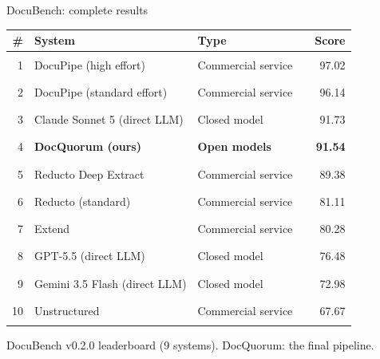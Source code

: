 \documentclass[aspectratio=169,10pt]{beamer}
\newcommand{\src}[1]{\par\vfill{\tiny\color{muted}#1\par}}
\begin{document}
\begin{frame}{DocuBench: complete results}
\begingroup\footnotesize\renewcommand{\arraystretch}{1.3}\setlength{\tabcolsep}{4pt}
\begin{tabularx}{\textwidth}{@{}rYl@{\hspace{6pt}}lr@{}}\toprule
\textbf{\#} & \textbf{System} & \textbf{Type} &  & \textbf{Score}\\ & DocuPipe (high effort) & {\color{routeB}Commercial service} & \textcolor{routeB!45}{\rule{1.16cm}{1.05ex}} & 97.02\\
2 & DocuPipe (standard effort) & {\color{routeB}Commercial service} & \textcolor{routeB!45}{\rule{1.15cm}{1.05ex}} & 96.14\\
3 & Claude Sonnet 5 (direct LLM) & {\color{muted}Closed model} & \textcolor{muted!45}{\rule{1.10cm}{1.05ex}} & 91.73\\
4 & \textbf{DocQuorum (ours)} & {\color{good}\textbf{Open models}} & \textcolor{good}{\rule{1.10cm}{1.05ex}} & \textbf{91.54}\\
5 & Reducto Deep Extract & {\color{routeB}Commercial service} & \textcolor{routeB!45}{\rule{1.07cm}{1.05ex}} & 89.38\\
6 & Reducto (standard) & {\color{routeB}Commercial service} & \textcolor{routeB!45}{\rule{0.97cm}{1.05ex}} & 81.11\\
7 & Extend & {\color{routeB}Commercial service} & \textcolor{routeB!45}{\rule{0.96cm}{1.05ex}} & 80.28\\
8 & GPT-5.5 (direct LLM) & {\color{muted}Closed model} & \textcolor{muted!45}{\rule{0.92cm}{1.05ex}} & 76.48\\
9 & Gemini 3.5 Flash (direct LLM) & {\color{muted}Closed model} & \textcolor{muted!45}{\rule{0.88cm}{1.05ex}} & 72.98\\
10 & Unstructured & {\color{routeB}Commercial service} & \textcolor{routeB!45}{\rule{0.81cm}{1.05ex}} & 67.67\\
\bottomrule\end{tabularx}\endgroup

\src{DocuBench v0.2.0 leaderboard (9 systems). DocQuorum: the final pipeline.}
\end{frame}
\end{document}
